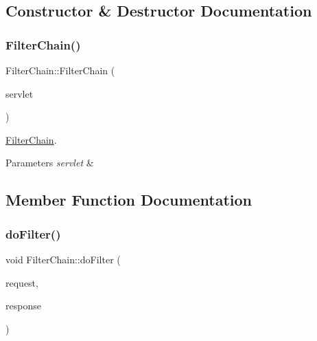 \subsection{Constructor \& Destructor Documentation}
\mbox{\label{class_filter_chain_a2631e4de118e5ea95f1f84c55828b526}} 
\subsubsection{\texorpdfstring{Filter\+Chain()}{FilterChain()}}
{\footnotesize\ttfamily Filter\+Chain\+::\+Filter\+Chain (\begin{DoxyParamCaption}\item[{\hyperlink{class_http_servlet}{Http\+Servlet} $\ast$}]{servlet }\end{DoxyParamCaption})\hspace{0.3cm}{\ttfamily [explicit]}}



\hyperlink{class_filter_chain}{Filter\+Chain}. 


\begin{DoxyParams}{Parameters}
{\em servlet} & \\
\hline
\end{DoxyParams}


\subsection{Member Function Documentation}
\mbox{\label{class_filter_chain_a2792dc5418eeb0914af046d78f679d51}} 
\subsubsection{\texorpdfstring{do\+Filter()}{doFilter()}}
{\footnotesize\ttfamily void Filter\+Chain\+::do\+Filter (\begin{DoxyParamCaption}\item[{C\+W\+F\+::\+Http\+Servlet\+Request \&}]{request,  }\item[{C\+W\+F\+::\+Http\+Servlet\+Response \&}]{response }\end{DoxyParamCaption})}




